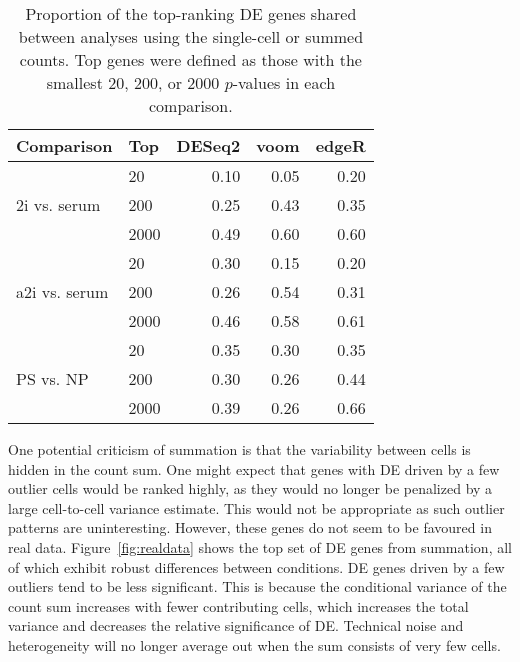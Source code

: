 \documentclass{article}
\begin{document}
\begin{table}[btp]
\caption{Proportion of the top-ranking DE genes shared between analyses using the single-cell or summed counts.
Top genes were defined as those with the smallest 20, 200, or 2000 $p$-values in each comparison.
}
\label{tab:realrank}
\begin{center}
\begin{tabular}{l l r r r}
\hline
\textbf{Comparison} & \textbf{Top} & \textbf{DESeq2} & \textbf{voom} & \textbf{edgeR} \\
\hline
\multirow{3}{*}{2i vs. serum} 
& 20 & 0.10 & 0.05 & 0.20 \\
& 200 & 0.25 & 0.43 & 0.35 \\
& 2000 & 0.49 & 0.60 & 0.60 \\
\hline
\multirow{3}{*}{a2i vs. serum} 
& 20 & 0.30 & 0.15 & 0.20 \\
& 200 & 0.26 & 0.54 & 0.31 \\
& 2000 & 0.46 & 0.58 & 0.61 \\
\hline
\multirow{3}{*}{PS vs. NP} 
& 20 & 0.35 & 0.30 & 0.35 \\
& 200 & 0.30 & 0.26 & 0.44 \\
& 2000 & 0.39 & 0.26 & 0.66 \\
\hline
\end{tabular}
\end{center}
\end{table}

One potential criticism of summation is that the variability between cells is hidden in the count sum.
One might expect that genes with DE driven by a few outlier cells would be ranked highly, as they would no longer be penalized by a large cell-to-cell variance estimate.
This would not be appropriate as such outlier patterns are uninteresting.
However, these genes do not seem to be favoured in real data.
Figure~\ref{fig:realdata} shows the top set of DE genes from summation, all of which exhibit robust differences between conditions.
DE genes driven by a few outliers tend to be less significant.
This is because the conditional variance of the count sum increases with fewer contributing cells, 
    which increases the total variance and decreases the relative significance of DE.
Technical noise and heterogeneity will no longer average out when the sum consists of very few cells.
\end{document}
